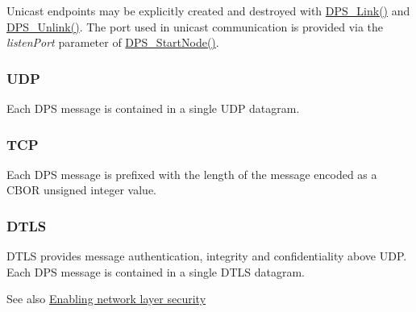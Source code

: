 Unicast endpoints may be explicitly created and destroyed with \hyperlink{group__node_ga5064c63b8ce76bf34402e0c80183234b}{D\+P\+S\+\_\+\+Link()} and \hyperlink{group__node_ga79c86c3c0c5d6438b953a9acaab0ab0b}{D\+P\+S\+\_\+\+Unlink()}. The port used in unicast communication is provided via the {\itshape listen\+Port} parameter of \hyperlink{group__node_ga160d504bfaeb0d3711e0259000340fe3}{D\+P\+S\+\_\+\+Start\+Node()}.\hypertarget{mesh-network_UDP}{}\subsubsection{U\+DP}\label{mesh-network_UDP}
Each D\+PS message is contained in a single U\+DP datagram.\hypertarget{mesh-network_TCP}{}\subsubsection{T\+CP}\label{mesh-network_TCP}
Each D\+PS message is prefixed with the length of the message encoded as a C\+B\+OR unsigned integer value.\hypertarget{mesh-network_DTLS}{}\subsubsection{D\+T\+LS}\label{mesh-network_DTLS}
D\+T\+LS provides message authentication, integrity and confidentiality above U\+DP. Each D\+PS message is contained in a single D\+T\+LS datagram.

\begin{DoxySeeAlso}{See also}
\hyperlink{tutorials-security_enabling-network-layer-security}{Enabling network layer security} 
\end{DoxySeeAlso}
